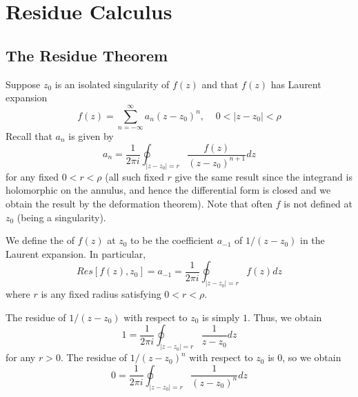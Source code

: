 %
%
%
\chapter{Residue Calculus}
\label{ResCalc} %

\section{The Residue Theorem}



Suppose $z_0$ is an isolated singularity of $f(z)$ and that $f(z)$ has Laurent expansion \begin{equation*}
    f(z) = \sum_{n=-\infty}^{\infty}a_n(z-z_0)^n,\;\;\;\;0<|z-z_0|<\rho
\end{equation*}
Recall that $a_n$ is given by \begin{equation*}
    a_n = \frac{1}{2\pi i}\oint_{|z-z_0| = r}\frac{f(z)}{(z-z_0)^{n+1}}dz
\end{equation*}
for any fixed $0 < r <\rho$ (all such fixed $r$ give the same result since the integrand is holomorphic on the annulus, and hence the differential form is closed and we obtain the result by the deformation theorem). Note that often $f$ is not defined at $z_0$ (being a singularity).

\begin{definition}
    We define the  of $f(z)$ at $z_0$ to be the coefficient $a_{-1}$ of $1/(z-z_0)$ in the Laurent expansion. In particular, \begin{equation*}
        Res[f(z),z_0] = a_{-1} = \frac{1}{2\pi i}\oint_{|z-z_0|=r}f(z)dz
    \end{equation*}
    where $r$ is any fixed radius satisfying $0 < r < \rho$.
\end{definition}

\begin{example}
    The residue of $1/(z-z_0)$ with respect to $z_0$ is simply $1$. Thus, we obtain \begin{equation*}
        1 = \frac{1}{2\pi i}\oint_{|z-z_0|=r}\frac{1}{z-z_0}dz
    \end{equation*}
    for any $r > 0$. The residue of $1/(z-z_0)^n$ with respect to $z_0$ is $0$, so we obtain \begin{equation*}
        0 = \frac{1}{2\pi i}\oint_{|z-z_0|=r}\frac{1}{(z-z_0)^n}dz
    \end{equation*}
\end{example}



